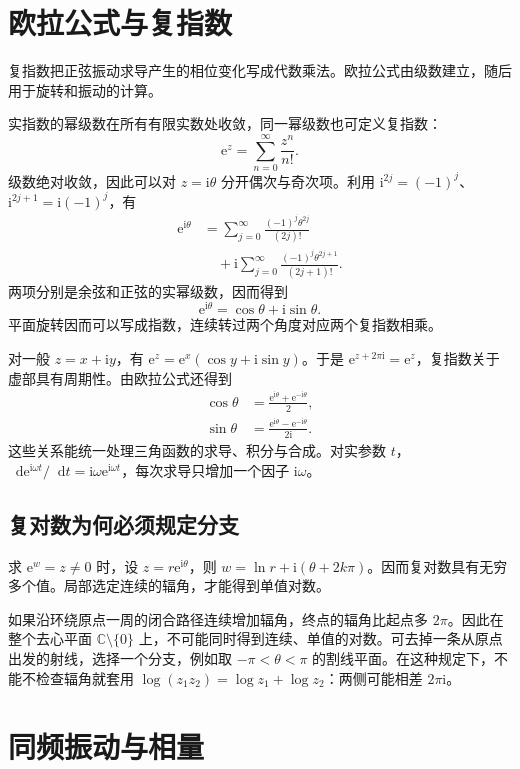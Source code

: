 \documentclass[11pt,openany,fontset=fandol]{ctexbook}
\theoremstyle{plain}\newtheorem{theorem}{定理}[chapter]\newtheorem{proposition}[theorem]{命题}
\theoremstyle{definition}\newtheorem{definition}{定义}[chapter]\newtheorem{example}{例}[chapter]
\theoremstyle{remark}\newtheorem*{remark}{说明}
\newcommand{\dd}{\mathop{}\!\mathrm d}\newcommand{\ii}{\mathrm i}\newcommand{\ee}{\mathrm e}
\begin{document}
\section{欧拉公式与复指数}
复指数把正弦振动求导产生的相位变化写成代数乘法。欧拉公式由级数建立，随后用于旋转和振动的计算。

实指数的幂级数在所有有限实数处收敛，同一幂级数也可定义复指数：
\begin{equation}
\ee^z=\sum_{n=0}^{\infty}\frac{z^n}{n!}.
\end{equation}
级数绝对收敛，因此可以对 $z=\ii\theta$ 分开偶次与奇次项。利用
$\ii^{2j}=(-1)^j$、$\ii^{2j+1}=\ii(-1)^j$，有
\begin{align*}
\ee^{\ii\theta}
&=\sum_{j=0}^{\infty}\frac{(-1)^j\theta^{2j}}{(2j)!}
\\&\quad+\ii\sum_{j=0}^{\infty}\frac{(-1)^j\theta^{2j+1}}{(2j+1)!}.
\end{align*}
两项分别是余弦和正弦的实幂级数，因而得到
\begin{equation}
\ee^{\ii\theta}=\cos\theta+\ii\sin\theta.
\end{equation}
平面旋转因而可以写成指数，连续转过两个角度对应两个复指数相乘。

对一般 $z=x+\ii y$，有 $\ee^z=\ee^x(\cos y+\ii\sin y)$。于是 $\ee^{z+2\pi\ii}=\ee^z$，复指数关于虚部具有周期性。由欧拉公式还得到
\begin{align}
\cos\theta&=\frac{\ee^{\ii\theta}+\ee^{-\ii\theta}}2,\\
\sin\theta&=\frac{\ee^{\ii\theta}-\ee^{-\ii\theta}}{2\ii}.
\end{align}
这些关系能统一处理三角函数的求导、积分与合成。对实参数 $t$，$\dd\ee^{\ii\omega t}/\dd t=\ii\omega\ee^{\ii\omega t}$，每次求导只增加一个因子 $\ii\omega$。

\subsection{复对数为何必须规定分支}
求 $\ee^w=z\ne0$ 时，设 $z=r\ee^{\ii\theta}$，则 $w=\ln r+\ii(\theta+2k\pi)$。因而复对数具有无穷多个值。局部选定连续的辐角，才能得到单值对数。

如果沿环绕原点一周的闭合路径连续增加辐角，终点的辐角比起点多 $2\pi$。因此在整个去心平面 $\mathbb C\setminus\{0\}$ 上，不可能同时得到连续、单值的对数。可去掉一条从原点出发的射线，选择一个分支，例如取 $-\pi<\theta<\pi$ 的割线平面。在这种规定下，不能不检查辐角就套用 $\log(z_1z_2)=\log z_1+\log z_2$：两侧可能相差 $2\pi\ii$。

\section{同频振动与相量}
\end{document}
